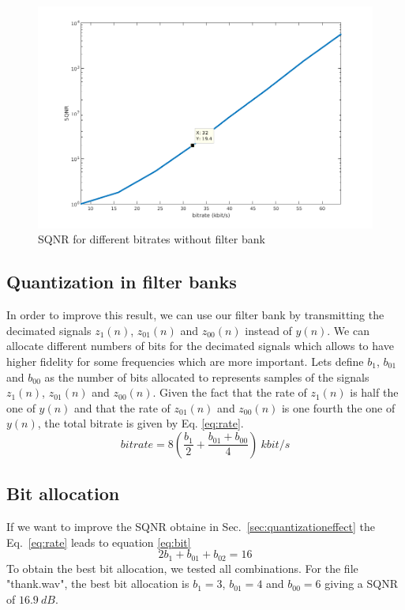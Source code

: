 \documentclass[a4paper,twocolumn]{article}
\begin{document}
\begin{figure}[!ht]
  \begin{center}
    \includegraphics[width=1.1\columnwidth]{quantization.png}
  \end{center}
  \caption{SQNR for different bitrates without filter bank}
  \label{fig:quant}
\end{figure}

\subsection{Quantization in filter banks}
In order to improve this result, we can use our filter bank by transmitting the decimated signals $z_{1}(n)$, $z_{01}(n)$ and $z_{00}(n)$ instead of $y(n)$. We can allocate different numbers of bits for the decimated signals which allows to have higher fidelity for some frequencies which are more important.
Lets define $b_{1}$, $b_{01}$ and $b_{00}$ as the number of bits allocated to represents samples of the signals $z_{1}(n)$, $z_{01}(n)$ and $z_{00}(n)$.
Given the fact that the rate of $z_{1}(n)$ is half the one of $y(n)$ and that the rate of $z_{01}(n)$ and $z_{00}(n)$ is one fourth the one of $y(n)$, the total bitrate is given by Eq. \ref{eq:rate}.
\begin{equation}
  \label{eq:rate}
  bitrate = 8(\frac{b_{1}}{2}+\frac{b_{01}+b_{00}}{4})~kbit/s
\end{equation}


\subsection{Bit allocation}
If we want to improve the SQNR obtaine in Sec.~\ref{sec:quantizationeffect} the Eq.~\ref{eq:rate} leads to equation \ref{eq:bit}
\begin{equation}
  \label{eq:bit}
  2b_{1}+b_{01}+b_{02}=16
\end{equation}
To obtain the best bit allocation, we tested all combinations. For the file "thank.wav", the best bit allocation is $b_{1}=3$, $b_{01}=4$ and $b_{00}=6$ giving a SQNR of $16.9~dB$.\\
\end{document}
